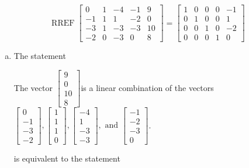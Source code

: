 \begin{exerciseAnswer} 
\[\operatorname{RREF}  \left[\begin{array}{cccc|c}
0 & 1 & -4 & -1 & 9 \\
-1 & 1 & 1 & -2 & 0 \\
-3 & 1 & -3 & -3 & 10 \\
-2 & 0 & -3 & 0 & 8
\end{array}\right] = \left[\begin{array}{cccc|c}
1 & 0 & 0 & 0 & -1 \\
0 & 1 & 0 & 0 & 1 \\
0 & 0 & 1 & 0 & -2 \\
0 & 0 & 0 & 1 & 0
\end{array}\right] \]
\begin{enumerate}[(a)]
\item  The statement 
\begin{center}\begin{minipage}{0.8\textwidth}
 The vector \( \left[\begin{array}{c}
9 \\
0 \\
10 \\
8
\end{array}\right] \)is a linear combination of the vectors \( \left[\begin{array}{c}
0 \\
-1 \\
-3 \\
-2
\end{array}\right] , \left[\begin{array}{c}
1 \\
1 \\
1 \\
0
\end{array}\right] , \left[\begin{array}{c}
-4 \\
1 \\
-3 \\
-3
\end{array}\right] , \text{ and } \left[\begin{array}{c}
-1 \\
-2 \\
-3 \\
0
\end{array}\right] \). 
\end{minipage}\end{center}
     is equivalent to the statement 
\begin{center}\begin{minipage}{0.8\textwidth}

\end{minipage}
\end{center}
\end{enumerate}
\end{exerciseAnswer}
